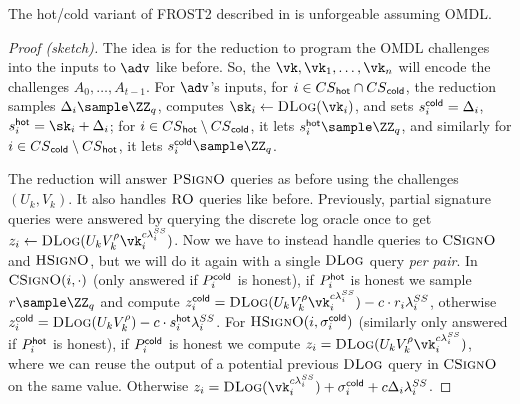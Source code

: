\begin{theorem}
    The hot/cold variant of FROST2 described in  is unforgeable assuming OMDL.
\end{theorem}
\begin{proof}[Proof (sketch)]
The idea is for the reduction to program the OMDL challenges into the inputs to $\adv$ like before. So, the $\vk, \vk_1, \dots, \vk_n$ will encode the challenges $A_0, \dots, A_{t-1}$. For $\adv$'s inputs, for $i \in {\ensuremath{CS}}_{\mathsf{hot}} \cap {\ensuremath{CS}}_{\mathsf{cold}}$, the reduction samples $\Delta_i \sample \ZZ_q$, computes $\sk_i \gets \DLogO(\vk_i)$, and sets $s_i^{\mathsf{cold}} = \Delta_i$, $\hsecret = \sk_i + \Delta_i$; for $i \in {\ensuremath{CS}}_{\mathsf{hot}} \setminus {\ensuremath{CS}}_{\mathsf{cold}}$, it lets $\hsecret \sample \ZZ_q$, and similarly for $i \in {\ensuremath{CS}}_{\mathsf{cold}} \setminus {\ensuremath{CS}}_{\mathsf{hot}}$, it lets $\csecret \sample \ZZ_q$.

The reduction will answer ${\textsc{PSignO}}$ queries as before using the challenges $(U_k,V_k)$. It also handles ${\textsc{RO}}$ queries like before. Previously, partial signature queries were answered by querying the discrete log oracle once to get $z_i \gets \DLogO(U_k V_k^\rho \vk_i^{c \lambda_i^\signset})$. Now we have to instead handle queries to ${\textsc{CSignO}}$ and ${\textsc{HSignO}}$, but we will do it again with a single ${\textsc{DLog}}$ query \emph{per pair}. In ${\textsc{CSignO}}(i, \cdot)$ (only answered if $P_i^{\mathsf{cold}}$ is honest), if $P_i^{\mathsf{hot}}$ is honest we sample $r \sample \ZZ_q$ and compute $z_i^\cold = \DLogO(U_k V_k^\rho \vk_i^{c \lambda_i^\signset}) - c \cdot r_i \lambda_i^\signset$, otherwise $z_i^{\mathsf{cold}} = {\textsc{DLog}}(U_k V_k^\rho) - c \cdot s_i^{\mathsf{hot}} \lambda_i^{SS}$. For ${\textsc{HSignO}}(i, \sigma_i^{\mathsf{cold}})$ (similarly only answered if $P_i^{\mathsf{hot}}$ is honest), if $P_i^{\mathsf{cold}}$ is honest we compute $z_i = \DLogO(U_k V_k^\rho \vk_i^{c \lambda_i^\signset})$, where we can reuse the output of a potential previous ${\textsc{DLog}}$ query in ${\textsc{CSignO}}$ on the same value. Otherwise $z_i = \DLogO(\vk_i^{c \lambda_i^\signset}) + \sigma_i^\cold + c \Delta_i \lambda_i^\signset$.


\end{proof}
